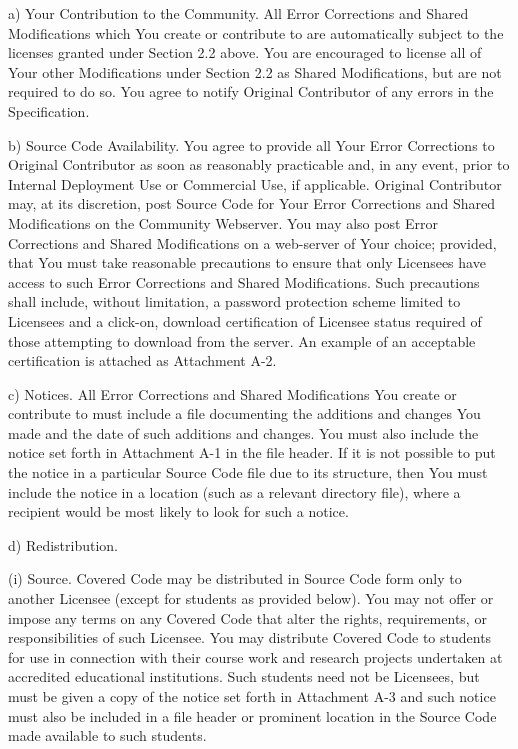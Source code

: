 {a) Your Contribution to the Community.  All Error Corrections and
Shared Modifications which You create or contribute to are
automatically subject to the licenses granted under Section 2.2 above.
You are encouraged to license all of Your other Modifications under
Section 2.2 as Shared Modifications, but are not required to do so.
You agree to notify Original Contributor of any errors in the
Specification.

b) Source Code Availability.  You agree to provide all Your Error
Corrections to Original Contributor as soon as reasonably practicable
and, in any event, prior to Internal Deployment Use or Commercial Use,
if applicable.  Original Contributor may, at its discretion, post
Source Code for Your Error Corrections and Shared Modifications on the
Community Webserver.  You may also post Error Corrections and Shared
Modifications on a web-server of Your choice; provided, that You must
take reasonable precautions to ensure that only Licensees have access
to such Error Corrections and Shared Modifications.  Such precautions
shall include, without limitation, a password protection scheme
limited to Licensees and a click-on, download certification of
Licensee status required of those attempting to download from the
server.  An example of an acceptable certification is attached as
Attachment A-2.

c) Notices.  All Error Corrections and Shared Modifications You create
or contribute to must include a file documenting the additions and
changes You made and the date of such additions and changes.  You must
also include the notice set forth in Attachment A-1 in the file
header.  If it is not possible to put the notice in a particular
Source Code file due to its structure, then You must include the
notice in a location (such as a relevant directory file), where a
recipient would be most likely to look for such a notice.

d) Redistribution.

(i) Source.  Covered Code may be distributed in Source Code form only
to another Licensee (except for students as provided below).  You may
not offer or impose any terms on any Covered Code that alter the
rights, requirements, or responsibilities of such Licensee.  You may
distribute Covered Code to students for use in connection with their
course work and research projects undertaken at accredited educational
institutions.  Such students need not be Licensees, but must be given
a copy of the notice set forth in Attachment A-3 and such notice must
also be included in a file header or prominent location in the Source
Code made available to such students.

}
